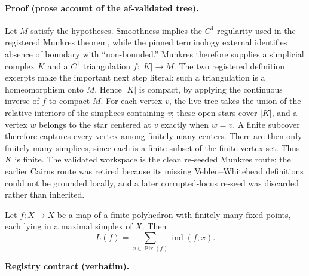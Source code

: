 \paragraph{Proof (prose account of the af-validated tree).}
Let $M$ satisfy the hypotheses.
Smoothness implies the $C^1$ regularity used in the
registered Munkres theorem, while the pinned terminology external identifies absence
of boundary with ``non-bounded.''  Munkres therefore supplies a simplicial complex
$K$ and a $C^1$ triangulation $f:|K|\to M$.  The two registered definition excerpts
make the important next step literal: such a triangulation is a homeomorphism onto
$M$.  Hence $|K|$ is compact, by applying the continuous inverse of $f$ to compact
$M$.  For each vertex $v$, the live tree takes the union of the relative interiors of
the simplices containing $v$; these open stars cover $|K|$, and a vertex $w$ belongs
to the star centered at $v$ exactly when $w=v$.  A finite subcover therefore captures
every vertex among finitely many centers.  There are then only finitely many simplices,
since each is a finite subset of the finite vertex set.  Thus $K$ is finite.
The validated workspace is the clean re-seeded Munkres route: the earlier Cairns route
was retired because its missing Veblen--Whitehead definitions could not be grounded
locally, and a later corrupted-locus re-seed was discarded rather than inherited.

\begin{lemma}\label{lem:topology-lefschetz-hopf}
Let $f:X\to X$ be a map of a finite polyhedron with finitely many fixed points,
each lying in a maximal simplex of $X$.  Then
\[
  L(f)=\sum_{x\in\operatorname{Fix}(f)}\operatorname{ind}(f,x).
\]
\end{lemma}

\noindent\textbf{Registry contract (verbatim).}

